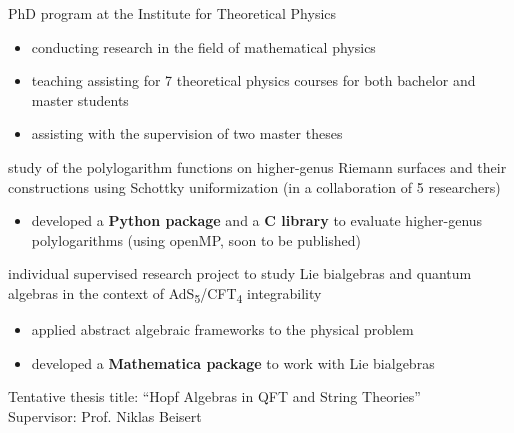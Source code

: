 \documentclass[10pt,a4paper,ragged2e,withhyper]{altacv}
\newcommand{\highlight}[1]{{\color{ETHBlue120}\textbf{#1}}}
\begin{document}
\begin{paracol}{2}

PhD program at the Institute for Theoretical Physics
\begin{itemize}
  \item conducting research in the field of mathematical physics
  \item teaching assisting for 7 theoretical physics courses for both bachelor and master students
  \item assisting with the supervision of two master theses
\end{itemize}


\vspace{-0.25em}
study of the polylogarithm functions on higher-genus Riemann surfaces and their 
constructions using Schottky uniformization (in a collaboration of 5 researchers)
\begin{itemize}
  \item developed a \highlight{Python package} and a \highlight{C library} to evaluate higher-genus polylogarithms (using openMP, soon to be published)
\end{itemize}

\medskip

\vspace{-0.25em}
individual supervised research project to study Lie bialgebras and quantum algebras in the context of AdS\textsubscript{5}/CFT\textsubscript{4} integrability
\begin{itemize}
\item applied abstract algebraic frameworks to the physical problem
\item developed a \highlight{Mathematica package} to work with Lie bialgebras
\end{itemize}


{\color{ETHBlue80}Tentative thesis title:} ``Hopf Algebras in QFT and String Theories''\\
{\color{ETHBlue80}Supervisor:} Prof. Niklas Beisert


\end{paracol}
\end{document}
